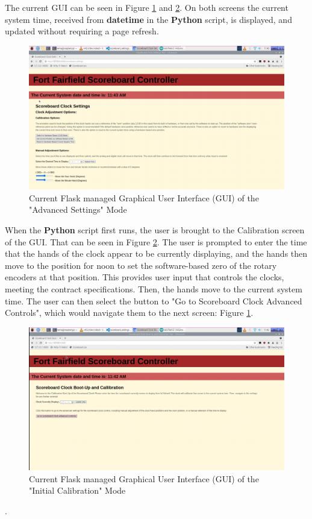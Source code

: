 \documentclass[11pt]{article}
\begin{document}
The current GUI can be seen in Figure \ref{currGUI} and \ref{currGUICalli}. On both screens the current system time, received from \textbf{datetime} in the \textbf{Python} script, is displayed, and updated without requiring a page refresh. 

\begin{figure}[H]
\centering
\includegraphics[width=6.5in]{main_gui.PNG}
\caption{Current Flask managed Graphical User Interface (GUI) of the "Advanced Settings" Mode}
\label{currGUI}
\end{figure}

When the \textbf{Python} script first runs, the user is brought to the Calibration screen of the GUI. That can be seen in Figure \ref{currGUICalli}. The user is prompted to enter the time that the hands of the clock appear to be currently displaying, and the hands then move to the position for noon to set the software-based zero of the rotary encoders at that position. This provides user input that controls the clocks, meeting the contract specifications. Then, the hands move to the current system time. The user can then select the button to "Go to Scoreboard Clock Advanced Controls", which would navigate them to the next screen: Figure \ref{currGUI}.

\begin{figure}[H]
\centering
\includegraphics[width=6.5in]{callibration_screen.PNG}
\caption{Current Flask managed Graphical User Interface (GUI) of the "Initial Calibration" Mode}
\label{currGUICalli}
\end{figure}.
\end{document}
